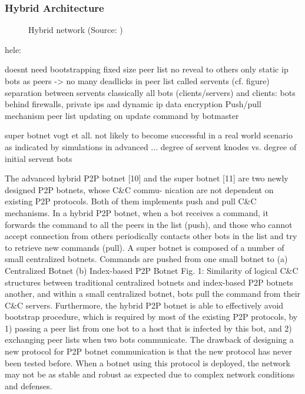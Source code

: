 \documentclass{llncs}
\begin{document}
\subsubsection{Hybrid Architecture}
\begin{figure}[htbp]
  \centering
  \caption{Hybrid network (Source: \cite{td1sc})}
  \label{hybrid-network}
\end{figure}
hele: \cite{td1sc}

doesnt need bootstrapping
fixed size peer list no reveal to others 
only static ip bots as peers -> no many deadlicks in peer list called servents (cf. figure)
separation between servents classically all bots (clients/servers) and clients: bots behind firewalls, private ips and dynamic ip
data encryption
Push/pull mechanism
peer list updating on update command by botmaster

super botnet vogt et all. not likely to become successful in a real world scenario as indicated by simulations in advanced ... degree of servent knodes vs. degree of initial servent bots


The advanced hybrid P2P botnet [10] and the super botnet [11] are two
newly designed P2P botnets, whose C\&C commu- nication are not
dependent on existing P2P protocols. Both of them implements push and
pull C\&C mechanisms. In a hybrid P2P botnet, when a bot receives a
command, it forwards the command to all the peers in the list (push),
and those who cannot accept connection from others periodically
contacts other bots in the list and try to retrieve new commands
(pull).  A super botnet is composed of a number of small centralized
botnets. Commands are pushed from one small botnet to (a) Centralized
Botnet (b) Index-based P2P Botnet Fig. 1: Similarity of logical C\&C
structures between traditional centralized botnets and index-based P2P
botnets another, and within a small centralized botnet, bots pull the
command from their C\&C servers. Furthermore, the hybrid P2P botnet is
able to effectively avoid bootstrap procedure, which is required by
most of the existing P2P protocols, by 1) passing a peer list from one
bot to a host that is infected by this bot, and 2) exchanging peer
lists when two bots communicate.  The drawback of designing a new
protocol for P2P botnet communication is that the new protocol has
never been tested before. When a botnet using this protocol is
deployed, the network may not be as stable and robust as expected due
to complex network conditions and defenses.
\end{document}
